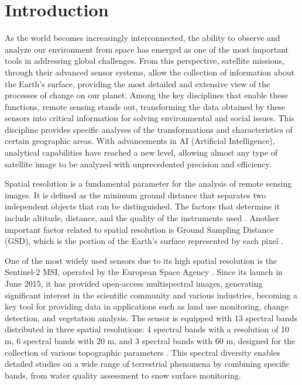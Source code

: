 \chapter{Introduction}

As the world becomes increasingly interconnected, the ability to observe and analyze our environment from space has emerged as one of the most important tools in addressing global challenges. From this perspective, satellite missions, through their advanced sensor systems, allow the collection of information about the Earth's surface, providing the most detailed and extensive view of the processes of change on our planet. Among the key disciplines that enable these functions, remote sensing stands out, transforming the data obtained by these sensors into critical information for solving environmental and social issues. This discipline provides specific analyses of the transformations and characteristics of certain geographic areas. With advancements in AI (Artificial Intelligence), analytical capabilities have reached a new level, allowing almost any type of satellite image to be analyzed with unprecedented precision and efficiency.

Spatial resolution is a fundamental parameter for the analysis of remote sensing images. It is defined as the minimum ground distance that separates two independent objects that can be distinguished. The factors that determine it include altitude, distance, and the quality of the instruments used \autocite{alparone2015remote}. Another important factor related to spatial resolution is Ground Sampling Distance (GSD), which is the portion of the Earth's surface represented by each pixel \autocite{lillesand2015remote}.

One of the most widely used sensors due to its high spatial resolution is the Sentinel-2 MSI, operated by the European Space Agency \autocite{Sentinel2_Handbook}. Since its launch in June 2015, it has provided open-access multispectral images, generating significant interest in the scientific community and various industries, becoming a key tool for providing data in applications such as land use monitoring, change detection, and vegetation analysis. The sensor is equipped with 13 spectral bands distributed in three spatial resolutions: 4 spectral bands with a resolution of 10 m, 6 spectral bands with 20 m, and 3 spectral bands with 60 m, designed for the collection of various topographic parameters \autocite{lanaras2018super}. This spectral diversity enables detailed studies on a wide range of terrestrial phenomena by combining specific bands, from water quality assessment to snow surface monitoring.

